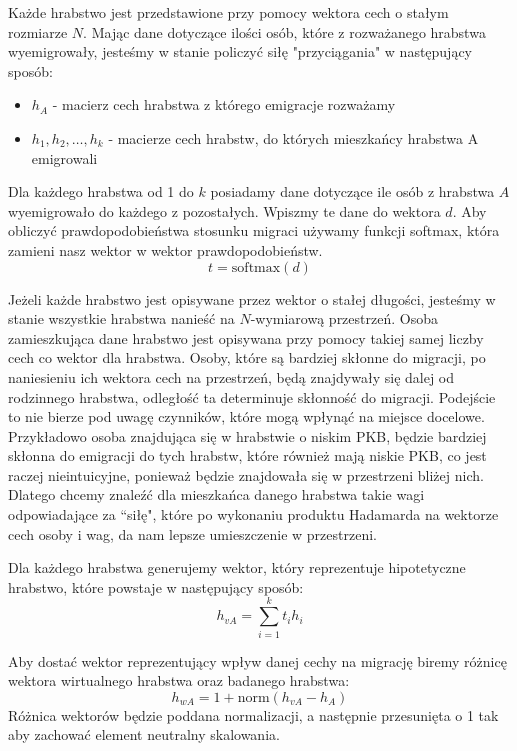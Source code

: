 \documentclass[a4paper,12pt]{article}
\newcommand{\softmax}{\mathrm{softmax}}
\begin{document}
Każde hrabstwo jest przedstawione przy pomocy wektora cech o stałym rozmiarze $N$. Mając dane dotyczące ilości osób, które z rozważanego hrabstwa wyemigrowały, jesteśmy w stanie policzyć siłę "przyciągania" w następujący sposób:
\begin{itemize}
    \item $h_A$ - macierz cech hrabstwa z którego emigracje rozważamy
    \item $h_1, h_2, \dots, h_k$ - macierze cech hrabstw, do których mieszkańcy hrabstwa A emigrowali
\end{itemize}
Dla każdego hrabstwa od 1 do $k$ posiadamy dane dotyczące ile osób z hrabstwa $A$ wyemigrowało do każdego z pozostałych. Wpiszmy te dane do wektora $d$. Aby obliczyć prawdopodobieństwa stosunku migraci używamy funkcji softmax, która zamieni nasz wektor w wektor prawdopodobieństw.
\begin{equation}
    t = \softmax(d)
\end{equation}

Jeżeli każde hrabstwo jest opisywane przez wektor o stałej długości, jesteśmy w stanie wszystkie hrabstwa nanieść na $N$-wymiarową przestrzeń. Osoba zamieszkująca dane hrabstwo jest opisywana przy pomocy takiej samej liczby cech co wektor dla hrabstwa. Osoby, które są bardziej skłonne do migracji, po naniesieniu ich wektora cech na przestrzeń, będą znajdywały się dalej od rodzinnego hrabstwa, odległość ta determinuje skłonność do migracji. Podejście to nie bierze pod uwagę czynników, które mogą wpłynąć na miejsce docelowe. Przykładowo osoba znajdująca się w hrabstwie o niskim PKB, będzie bardziej skłonna do emigracji do tych hrabstw, które również mają niskie PKB, co jest raczej nieintuicyjne, ponieważ będzie znajdowała się w przestrzeni bliżej nich. Dlatego chcemy znaleźć dla mieszkańca danego hrabstwa takie wagi odpowiadające za ``siłę", które po wykonaniu produktu Hadamarda na wektorze cech osoby i wag, da nam lepsze umieszczenie w przestrzeni.

Dla każdego hrabstwa generujemy wektor, który reprezentuje hipotetyczne hrabstwo, które powstaje w następujący sposób:
\begin{equation}
    h_{vA} = \sum_{i=1}^{k} t_i h_i
\end{equation}

Aby dostać wektor reprezentujący wpływ danej cechy na migrację biremy różnicę wektora wirtualnego hrabstwa oraz badanego hrabstwa:
\begin{equation}
    h_{wA} = 1 + \mathrm{norm}(h_{vA} - h_{A})
\end{equation}
Różnica wektorów będzie poddana normalizacji, a następnie przesunięta o 1 tak aby zachować element neutralny skalowania.
\end{document}
